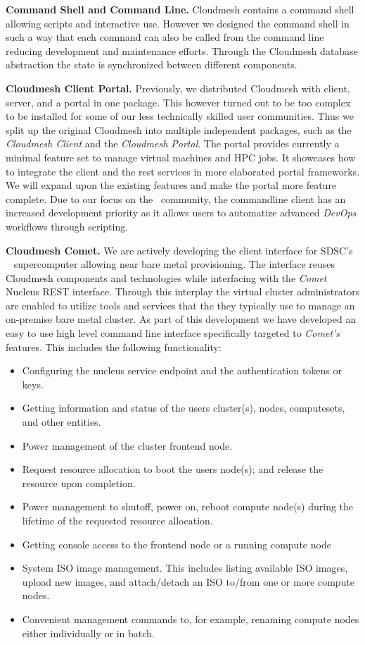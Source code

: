 \parindent 0pt { \bf Command Shell and Command Line.} Cloudmesh contains a
command shell allowing scripts and interactive use. However we
designed the command shell in such a way that each command can also be
called from the command line reducing development and maintenance
efforts. Through the Cloudmesh database abstraction the state is
synchronized between different components.

\parindent 0pt { \bf Cloudmesh Client Portal.} Previously, we
distributed Cloudmesh with client, server, and a portal in one
package. This however turned out to be too complex to be installed for
some of our less technically skilled user communities. Thus we split up
the original Cloudmesh into multiple independent packages, such as the
{\em Cloudmesh Client} and the {\em Cloudmesh Portal}. The portal
provides currently a minimal feature set to manage virtual machines
and HPC jobs. It showcases how to integrate the client and the rest
services in more elaborated portal frameworks. We will expand upon the
existing features and make the portal more feature complete. Due to
our focus on the \Comet~community, the commandline client has an
increased development priority as it allows users to automatize
advanced {\em DevOps} workflows through scripting.

\parindent 0pt { \bf Cloudmesh Comet.} We are actively developing the
client interface for SDSC's \Comet~\cite{www-comet-user-manual}
supercomputer allowing near bare metal provisioning. The interface
reuses Cloudmesh components and technologies while interfacing with
the {\em Comet} Nucleus REST interface. Through this interplay the virtual
cluster administrators are enabled to utilize tools and services that
the they typically use to manage an on-premise bare metal cluster. As
part of this development we have developed an easy to use high level
command line interface specifically targeted to {\em Comet's\/} features. This
includes the following functionality:

\begin{itemize}
\item Configuring the nucleus service endpoint and the authentication
  tokens or keys.
\item Getting information and status of the users cluster(s), nodes,
  computesets, and other entities.
\item Power management of the cluster frontend node.
\item Request resource allocation to boot the users node(s); and release
  the resource upon completion.
\item Power management to shutoff, power on, reboot compute node(s)
  during the lifetime of the requested resource allocation.
\item Getting console access to the frontend node or a running compute
  node
\item System ISO image management. This includes listing available ISO
  images, upload new images, and attach/detach an ISO to/from one or
  more compute nodes.
\item Convenient management commands to, for example, renaming compute
  nodes either individually or in batch.
\end{itemize}

